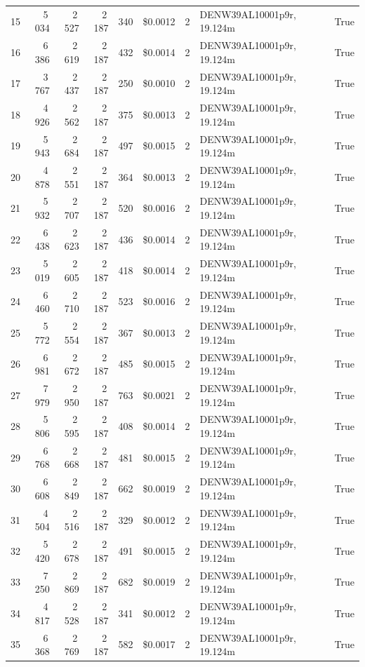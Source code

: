 \documentclass[a4paper,11pt]{article}
\begin{document}
\begin{table}[ht]
\begin{tabular}{r r r r r r r p{3cm} l}
15 & 5\,034 & 2\,527 & 2\,187 & 340 & \$0.0012 & 2 & DENW39AL10001p9r, 19.124m & True \\
16 & 6\,386 & 2\,619 & 2\,187 & 432 & \$0.0014 & 2 & DENW39AL10001p9r, 19.124m & True \\
17 & 3\,767 & 2\,437 & 2\,187 & 250 & \$0.0010 & 2 & DENW39AL10001p9r, 19.124m & True \\
18 & 4\,926 & 2\,562 & 2\,187 & 375 & \$0.0013 & 2 & DENW39AL10001p9r, 19.124m & True \\
19 & 5\,943 & 2\,684 & 2\,187 & 497 & \$0.0015 & 2 & DENW39AL10001p9r, 19.124m & True \\
20 & 4\,878 & 2\,551 & 2\,187 & 364 & \$0.0013 & 2 & DENW39AL10001p9r, 19.124m & True \\
21 & 5\,932 & 2\,707 & 2\,187 & 520 & \$0.0016 & 2 & DENW39AL10001p9r, 19.124m & True \\
22 & 6\,438 & 2\,623 & 2\,187 & 436 & \$0.0014 & 2 & DENW39AL10001p9r, 19.124m & True \\
23 & 5\,019 & 2\,605 & 2\,187 & 418 & \$0.0014 & 2 & DENW39AL10001p9r, 19.124m & True \\
24 & 6\,460 & 2\,710 & 2\,187 & 523 & \$0.0016 & 2 & DENW39AL10001p9r, 19.124m & True \\
25 & 5\,772 & 2\,554 & 2\,187 & 367 & \$0.0013 & 2 & DENW39AL10001p9r, 19.124m & True \\
26 & 6\,981 & 2\,672 & 2\,187 & 485 & \$0.0015 & 2 & DENW39AL10001p9r, 19.124m & True \\
27 & 7\,979 & 2\,950 & 2\,187 & 763 & \$0.0021 & 2 & DENW39AL10001p9r, 19.124m & True \\
28 & 5\,806 & 2\,595 & 2\,187 & 408 & \$0.0014 & 2 & DENW39AL10001p9r, 19.124m & True \\
29 & 6\,768 & 2\,668 & 2\,187 & 481 & \$0.0015 & 2 & DENW39AL10001p9r, 19.124m & True \\
30 & 6\,608 & 2\,849 & 2\,187 & 662 & \$0.0019 & 2 & DENW39AL10001p9r, 19.124m & True \\
31 & 4\,504 & 2\,516 & 2\,187 & 329 & \$0.0012 & 2 & DENW39AL10001p9r, 19.124m & True \\
32 & 5\,420 & 2\,678 & 2\,187 & 491 & \$0.0015 & 2 & DENW39AL10001p9r, 19.124m & True \\
33 & 7\,250 & 2\,869 & 2\,187 & 682 & \$0.0019 & 2 & DENW39AL10001p9r, 19.124m & True \\
34 & 4\,817 & 2\,528 & 2\,187 & 341 & \$0.0012 & 2 & DENW39AL10001p9r, 19.124m & True \\
35 & 6\,368 & 2\,769 & 2\,187 & 582 & \$0.0017 & 2 & DENW39AL10001p9r, 19.124m & True \\

\end{tabular}
\end{table}
\end{document}
